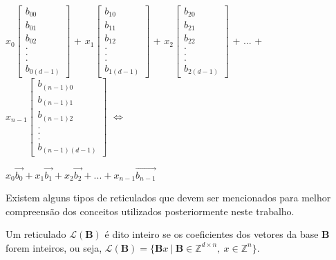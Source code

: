     \begin{center}
        $x_0\begin{bmatrix} b_{00} \\ b_{01} \\ b_{02} \\ . \\ . \\ . \\ b_{0 (d-1)} \end{bmatrix}$ + 
        $x_1\begin{bmatrix} b_{10} \\ b_{11} \\ b_{12} \\ . \\ . \\ . \\ b_{1 (d-1)} \end{bmatrix}$ +
        $x_2\begin{bmatrix} b_{20} \\ b_{21} \\ b_{22} \\ . \\ . \\ . \\ b_{2 (d-1)} \end{bmatrix}$ + ... +
        $x_{n-1}\begin{bmatrix} b_{(n-1) 0} \\ b_{(n-1) 1} \\ b_{(n-1) 2} \\ . \\ . \\ . \\ b_{(n-1) (d-1)} \end{bmatrix}$
        $\Leftrightarrow$\\
    \end{center}

    \begin{center}
        $x_0 \vec{b_0} + x_1 \vec{b_1} + x_2 \vec{b_2} + ... + x_{n-1} \vec{b_{n-1}}$
    \end{center}

    Existem alguns tipos de reticulados que devem ser mencionados para melhor compreensão dos conceitos utilizados posteriormente neste trabalho.

    \begin{definition}
        Um reticulado $\mathcal{L}(\textbf{B})$ é dito inteiro se os coeficientes dos vetores da base $\textbf{B}$ forem inteiros, ou seja, $\mathcal{L}(\textbf{B}) = \{\textbf{B}x\ |\ \textbf{B} \in \mathbb{Z}^{d \times n},\ x \in \mathbb{Z}^n\}$.
    \end{definition}

